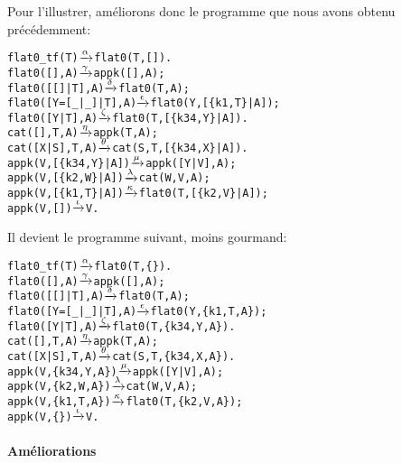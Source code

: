 Pour l'illustrer, améliorons donc le programme que nous avons obtenu
précédemment: 
\begin{alltt}
flat0\_tf(T)          \(\smashedrightarrow{\alpha}\) flat0(T,[]).
flat0(         [],A) \(\smashedrightarrow{\gamma}\) appk([],A);
flat0(     [[]|T],A) \(\smashedrightarrow{\delta}\) flat0(T,A);
flat0([Y=[\_|\_]|T],A) \(\smashedrightarrow{\epsilon}\) flat0(Y,[\{k1,T\}|A]);
flat0(    [Y|T],A)   \(\smashedrightarrow{\zeta}\) flat0(T,[\{k34,Y\}|A]).
cat(   [],T,A)       \(\smashedrightarrow{\eta}\) appk(T,A);
cat([X|S],T,A)       \(\smashedrightarrow{\theta}\) cat(S,T,[\{k34,X\}|A]).
appk(V,[\{k34,Y\}|A])  \(\smashedrightarrow{\mu}\) appk([Y|V],A);
appk(V, [\{k2,W\}|A])  \(\smashedrightarrow{\lambda}\) cat(W,V,A);
appk(V, [\{k1,T\}|A])  \(\smashedrightarrow{\kappa}\) flat0(T,[\{k2,V\}|A]);
appk(V,         [])  \(\smashedrightarrow{\iota}\) V.
\end{alltt}
Il devient le programme suivant, moins gourmand:
\begin{alltt}
flat0\_tf(T)          \(\smashedrightarrow{\alpha}\) flat0(T,\{\}).
flat0(         [],A) \(\smashedrightarrow{\gamma}\) appk([],A);
flat0(     [[]|T],A) \(\smashedrightarrow{\delta}\) flat0(T,A);
flat0([Y=[\_|\_]|T],A) \(\smashedrightarrow{\epsilon}\) flat0(Y,\{k1,T,A\});
flat0(      [Y|T],A) \(\smashedrightarrow{\zeta}\) flat0(T,\{k34,Y,A\}).
cat(   [],T,A)       \(\smashedrightarrow{\eta}\) appk(T,A);
cat([X|S],T,A)       \(\smashedrightarrow{\theta}\) cat(S,T,\{k34,X,A\}).
appk(V,\{k34,Y,A\})    \(\smashedrightarrow{\mu}\) appk([Y|V],A);
appk(V, \{k2,W,A\})    \(\smashedrightarrow{\lambda}\) cat(W,V,A);
appk(V, \{k1,T,A\})    \(\smashedrightarrow{\kappa}\) flat0(T,\{k2,V,A\});
appk(V,       \{\})    \(\smashedrightarrow{\iota}\) V.
\end{alltt}

\paragraph{Améliorations}
\label{par:fib_ameliorations}

